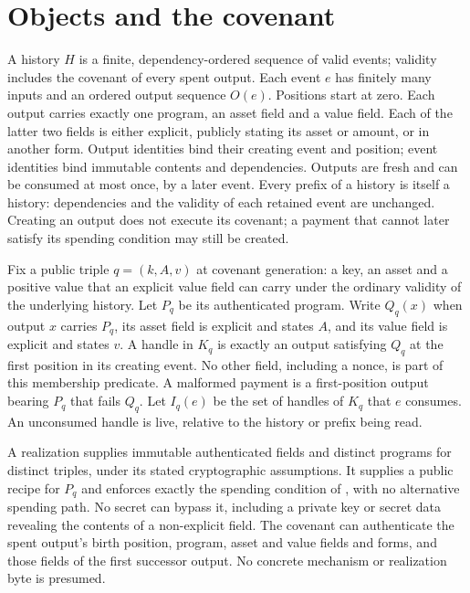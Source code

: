\documentclass[../main.tex]{subfiles}
\begin{document}
\section{Objects and the covenant}
\label{sec:kpcfixed:model}

\begin{definition}
\label{def:kpcfixed-model:history}
A history $H$ is a finite, dependency-ordered sequence of valid events;
validity includes the covenant of every spent output. Each event $e$ has
finitely many inputs and an ordered output sequence $O(e)$. Positions start at zero.
Each output carries exactly one program, an asset field and a value field.
Each of the latter two fields is either explicit, publicly stating its
asset or amount, or in another form.
Output identities bind their creating event and position; event identities bind
immutable contents and dependencies. Outputs are fresh and can be consumed
at most once, by a later event. Every prefix of a history is itself a
history: dependencies and the validity of each retained event are unchanged.
Creating an output does not execute its covenant; a payment that cannot
later satisfy its spending condition may still be created.
\end{definition}

\begin{definition}
\label{def:kpcfixed-model:keyed-membership}
Fix a public triple $q=(k,A,v)$ at covenant generation: a key, an asset
and a positive value that an explicit value field can carry under the
ordinary validity of the underlying history. Let $P_q$
be its authenticated program. Write $Q_q(x)$ when output $x$ carries
$P_q$, its asset field is explicit and states $A$, and its value field
is explicit and states $v$. A handle in $K_q$ is exactly an output satisfying $Q_q$ at the
first position in its creating event. No other field, including a nonce,
is part of this membership predicate.
A malformed payment is a first-position output bearing $P_q$ that fails $Q_q$.
Let $I_q(e)$ be the set of handles of $K_q$ that $e$ consumes.
An unconsumed handle is live, relative to the history or prefix being read.
\end{definition}

\begin{assumption}[Realization]
\label{assum:kpcfixed-model:realization}
A realization supplies immutable authenticated fields and distinct
programs for distinct triples, under its stated cryptographic assumptions.
It supplies a public recipe for $P_q$ and enforces exactly the spending
condition of , with no alternative
spending path. No secret can bypass it, including a private key or secret
data revealing the contents of a non-explicit field. The covenant can
authenticate the spent output's birth position, program, asset and value
fields and forms, and those fields of the first successor output.
No concrete mechanism or realization byte is presumed.
\end{assumption}
\end{document}
